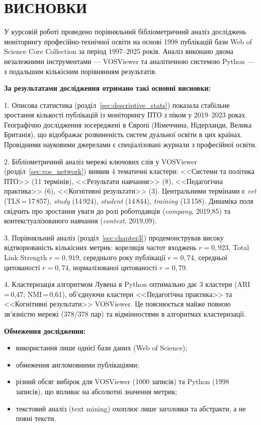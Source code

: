 \section*{\centering ВИСНОВКИ}

У курсовій роботі проведено порівняльний бібліометричний аналіз досліджень моніторингу професійно-технічної освіти на основі 1998 публікацій бази Web of Science Core Collection за період 1997--2025 років. Аналіз виконано двома незалежними інструментами --- VOSViewer та аналітичною системою Python --- з подальшим кількісним порівнянням результатів.

\textbf{За результатами дослідження отримано такі основні висновки:}

1. Описова статистика (розділ~\ref{sec:descriptive_stats}) показала стабільне зростання кількості публікацій із моніторингу ПТО з піком у 2019--2023 роках. Географічно дослідження зосереджені в Європі (Німеччина, Нідерланди, Велика Британія), що відображає розвиненість систем дуальної освіти в цих країнах. Провідними науковими джерелами є спеціалізовані журнали з професійної освіти.

2. Бібліометричний аналіз мережі ключових слів у VOSViewer (розділ~\ref{sec:vos_network}) виявив 4 тематичні кластери: <<Системи та політика ПТО>> (11 термінів), <<Результати навчання>> (8), <<Педагогічна практика>> (6), <<Когнітивні результати>> (3). Центральними термінами є \textit{vet} (TLS\,=\,17\,857), \textit{study} (14\,924), \textit{student} (14\,844), \textit{training} (13\,158). Динаміка поля свідчить про зростання уваги до ролі роботодавців (\textit{company}, 2019,85) та контекстуалізованого навчання (\textit{context}, 2019,09).

3. Порівняльний аналіз (розділ~\ref{sec:chapter3}) продемонстрував високу відтворюваність кількісних метрик: кореляція частот входжень $r = 0{,}923$, Total Link Strength $r = 0{,}919$, середнього року публікації $r = 0{,}74$, середньої цитованості $r = 0{,}74$, нормалізованої цитованості $r = 0{,}79$.

4. Кластеризація алгоритмом Лувена в Python оптимально дає 3 кластери (ARI\,=\,0,47; NMI\,=\,0,61), об'єднуючи кластери <<Педагогічна практика>> та <<Когнітивні результати>> VOSViewer. Це пояснюється майже повною зв'язністю мережі (378/378 пар) та відмінностями в алгоритмах кластеризації.

\textbf{Обмеження дослідження:}
\begin{itemize}
    \item використання лише однієї бази даних (Web of Science);
    \item обмеження англомовними публікаціями;
    \item різний обсяг вибірок для VOSViewer (1000 записів) та Python (1998 записів), що впливає на абсолютні значення метрик;
    \item текстовий аналіз (text mining) охоплює лише заголовки та абстракти, а не повні тексти.
\end{itemize}


